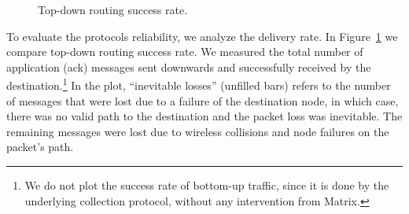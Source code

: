 \begin{figure}[t]
    \centering
    
    \caption{Top-down routing success rate.}
    \label{fig:txdwn}
\end{figure}

To evaluate the protocols reliability, we analyze the delivery rate. In Figure~\ref{fig:txdwn} we compare top-down routing success rate. We measured the total number of application (ack) messages sent downwards and successfully received by the destination.\footnote{We do not plot the success rate of bottom-up traffic, since it is done by the underlying collection protocol, without any intervention from Matrix.} In the plot, ``inevitable losses'' (unfilled bars) refers to the number of messages that were lost due to a failure of the destination node, in which case, there was no valid path to the destination and the packet loss was inevitable. The remaining messages were lost due to wireless collisions and node failures on the packet's path. 

